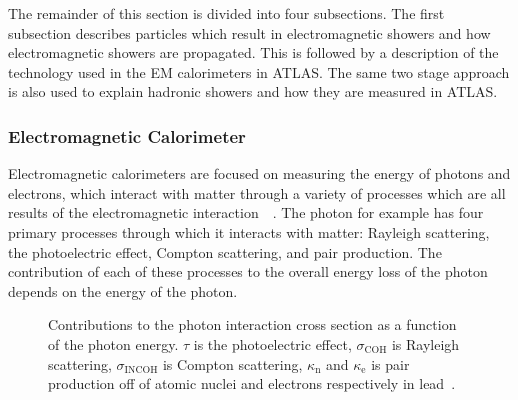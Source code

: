 The remainder of this section is divided into four subsections.  
The first subsection describes particles which result in electromagnetic showers and how electromagnetic showers are propagated.  
This is followed by a description of the technology used in the EM calorimeters in ATLAS.  
The same two stage approach is also used to explain hadronic showers and how they are measured in ATLAS.  

\subsubsection{Electromagnetic Calorimeter}
\label{EMCalo} 

Electromagnetic calorimeters are focused on measuring the energy of photons and electrons, which interact with matter through a variety of processes which are all results of the electromagnetic interaction~\cite{grupen2008particle}~\cite{Wigmans2008}.  
The photon for example has four primary processes through which it interacts with matter: Rayleigh scattering, the photoelectric effect, Compton scattering, and pair production.  
The contribution of each of these processes to the overall energy loss of the photon depends on the energy of the photon.  

\begin{figure}[!ht]
    \begin{center}
    \end{center}
        \caption[Contributions to the photon interaction cross section]
        {\small Contributions to the photon interaction cross section as a function of the photon energy.  $\tau$ is the photoelectric effect, $\sigma_{\mathrm{COH}}$ is Rayleigh scattering, $\sigma_{\mathrm{INCOH}}$ is Compton scattering, $\kappa_{\mathrm n}$ and $\kappa_{\mathrm e}$ is pair production off of atomic nuclei and electrons respectively in lead~\cite{:/content/aip/journal/jpcrd/9/4/10.1063/1.555629}. 
}
            \label{Photon}
\end{figure}

